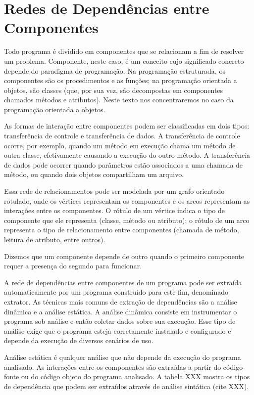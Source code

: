 \documentclass{article}
\begin{document}
\section{Redes de Dependências entre Componentes}

Todo programa é dividido em componentes que se relacionam a fim de resolver um problema. Componente, neste caso, é um conceito cujo significado concreto depende do paradigma de programação. Na programação estruturada, os componentes são os procedimentos e as funções; na programação orientada a objetos, são classes (que, por sua vez, são decompostas em componentes chamados métodos e atributos). Neste texto nos concentraremos no caso da programação orientada a objetos.

As formas de interação entre componentes podem ser classificadas em dois tipos: transferência de controle e transferência de dados. A transferência de controle ocorre, por exemplo, quando um método em execução chama um método de outra classe, efetivamente causando a execução do outro método. A transferência de dados pode ocorrer quando parâmetros estão associados a uma chamada de método, ou quando dois objetos compartilham um arquivo.

Essa rede de relacionamentos pode ser modelada por um grafo orientado rotulado, onde os vértices representam os componentes e os arcos representam as interações entre os componentes. O rótulo de um vértice indica o tipo de componente que ele representa (classe, método ou atributo); o rótulo de um arco representa o tipo de relacionamento entre componentes (chamada de método, leitura de atributo, entre outros).

Dizemos que um componente depende de outro quando o primeiro componente requer a presença do segundo para funcionar.

A rede de dependências entre componentes de um programa pode ser extraída automaticamente por um programa construído para este fim, denominado extrator. As técnicas mais comuns de extração de dependências são a análise dinâmica e a análise estática. A análise dinâmica consiste em instrumentar o programa sob análise e então coletar dados sobre sua execução. Esse tipo de análise exige que o programa esteja corretamente instalado e configurado e depende da execução de diversos cenários de uso.

Análise estática é qualquer análise que não depende da execução do programa analisado. As interações entre os componentes são extraídas a partir do código-fonte ou do código objeto do programa analisado. A tabela XXX mostra os tipos de dependência que podem ser extraídos através de análise sintática (cite XXX).
\end{document}
